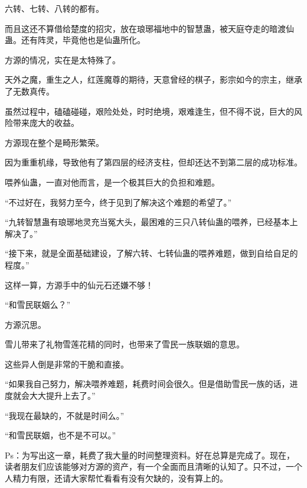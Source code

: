 \begin{this_body}
六转、七转、八转的都有。

而且这还不算借给楚度的招灾，放在琅琊福地中的智慧蛊，被天庭夺走的暗渡仙蛊。还有阵灵，毕竟他也是仙蛊所化。

方源的情况，实在是太特殊了。

天外之魔，重生之人，红莲魔尊的期待，天意曾经的棋子，影宗如今的宗主，继承了无数真传。

虽然过程中，磕磕碰碰，艰险处处，时时绝境，艰难逢生，但不得不说，巨大的风险带来庞大的收益。

方源现在整个是畸形繁荣。

因为重重机缘，导致他有了第四层的经济支柱，但却还达不到第二层的成功标准。

喂养仙蛊，一直对他而言，是一个极其巨大的负担和难题。

“不过好在，我努力至今，终于见到了解决这个难题的希望了。”

“九转智慧蛊有琅琊地灵充当冤大头，最困难的三只八转仙蛊的喂养，已经基本上解决了。”

“接下来，就是全面基础建设，了解六转、七转仙蛊的喂养难题，做到自给自足的程度。”

这样一算，方源手中的仙元石还嫌不够！

“和雪民联姻么？”

方源沉思。

雪儿带来了礼物雪莲花精的同时，也带来了雪民一族联姻的意思。

这些异人倒是非常的干脆和直接。

“如果我自己努力，解决喂养难题，耗费时间会很久。但是借助雪民一族的话，进度就会大大提升上去了。”

“我现在最缺的，不就是时间么。”

“和雪民联姻，也不是不可以。”

Ps：为写出这一章，耗费了我大量的时间整理资料。好在总算是完成了。现在，读者朋友们应该能够对方源的资产，有一个全面而且清晰的认知了。只不过，一个人精力有限，还请大家帮忙看看有没有欠缺的，没有算上的。

\end{this_body}

